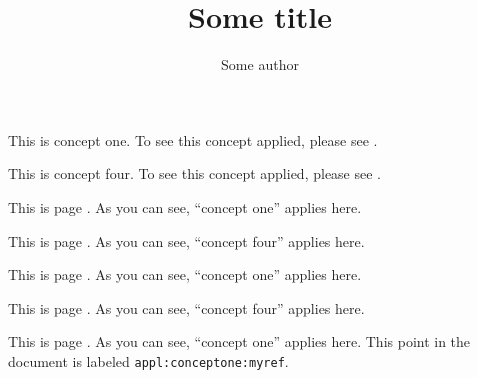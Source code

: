 \documentclass{article}
\begin{document}
\title{Some title}
\author{Some author}

\maketitle

This is concept one. To see this concept applied, please
see .

This is concept four. To see this concept applied, please
see .

\newpage

This is page \thepage. As you can see, ``concept
one'' applies here.\newpage

This is page \thepage. As you can see,
``concept four'' applies here.\newpage

This is page \thepage. As you can see, ``concept
one'' applies here.\newpage

This is page \thepage. As you can see,
``concept four'' applies here.\newpage

This is page \thepage. As you can
see, ``concept one'' applies here. This point in the document is
labeled \texttt{appl:conceptone:myref}.
\end{document}
